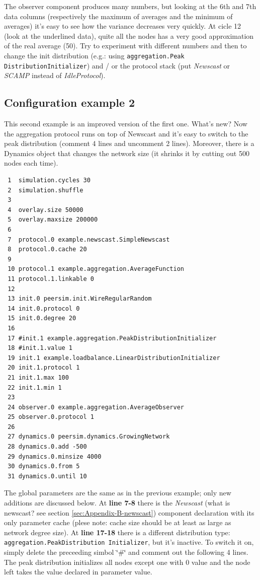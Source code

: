 \documentclass[a4paper,12pt]{article}
\begin{document}
\normalsize

The observer component produces many numbers, but looking at the 6th and
7th data columns (respectively the maximum of averages and the minimum
of averages) it's easy to see how the variance decreases very quickly.
At cicle 12 (look at the underlined data), quite all the nodes has
a very good approximation of the real average (50). Try to experiment
with different numbers and then to change the init distribution (e.g.:
using \texttt{aggregation.Peak DistributionInitializer}) and / or the
protocol stack (put \emph{Newscast} or \emph{SCAMP} instead of 
\emph{IdleProtocol}).


\subsection{Configuration example 2}

This second example is an improved version of the first one. What's
new? Now the aggregation protocol runs on top of Newscast and it's
easy to switch to the peak distribution (comment 4 lines and uncomment
2 lines). Moreover, there is a Dynamics object that changes the network
size (it shrinks it by cutting out 500 nodes each time). \\

\footnotesize
\begin{verbatim}
 1  simulation.cycles 30
 2  simulation.shuffle
 3
 4  overlay.size 50000
 5  overlay.maxsize 200000
 6
 7  protocol.0 example.newscast.SimpleNewscast
 8  protocol.0.cache 20
 9
 10 protocol.1 example.aggregation.AverageFunction
 11 protocol.1.linkable 0
 12
 13 init.0 peersim.init.WireRegularRandom
 14 init.0.protocol 0
 15 init.0.degree 20
 16 
 17 #init.1 example.aggregation.PeakDistributionInitializer
 18 #init.1.value 1
 19 init.1 example.loadbalance.LinearDistributionInitializer
 20 init.1.protocol 1
 21 init.1.max 100
 22 init.1.min 1
 23
 24 observer.0 example.aggregation.AverageObserver
 25 observer.0.protocol 1
 26
 27 dynamics.0 peersim.dynamics.GrowingNetwork
 28 dynamics.0.add -500
 29 dynamics.0.minsize 4000
 30 dynamics.0.from 5
 31 dynamics.0.until 10
\end{verbatim}
\normalsize

The global parameters are the same as in the previous example; only
new additions are discussed below. At \textbf{line 7-8} there is the
\emph{Newscast} (what is newscast? see section \ref{sec:Appendix-B-newscast}) 
component declaration with its
only parameter cache (plese note: cache size should be at least as
large as network degree size). At \textbf{line 17-18} there is a different
distribution type: \texttt{aggregation.PeakDistribution Initializer},
but it's inactive. To switch it on, simply delete the preceeding simbol
\char`\"{}\#\char`\"{} and comment out the following 4 lines. The
peak distribution initializes all nodes except one with 0 value and
the node left takes the value declared in parameter value.
\end{document}
